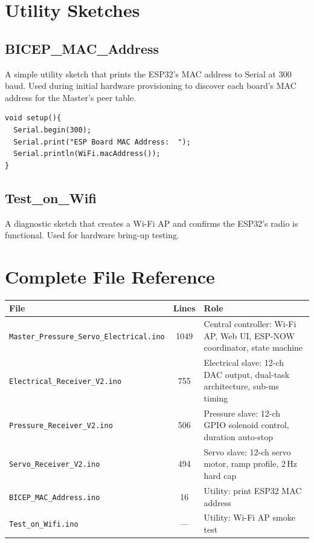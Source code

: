 \documentclass[11pt,a4paper]{article}
\begin{document}
\section{Utility Sketches}

\subsection{BICEP\_MAC\_Address}

A simple utility sketch that prints the ESP32's MAC address to Serial at
300\,baud. Used during initial hardware provisioning to discover each board's
MAC address for the Master's peer table.

\begin{lstlisting}[style=cppstyle]
void setup(){
  Serial.begin(300);
  Serial.print("ESP Board MAC Address:  ");
  Serial.println(WiFi.macAddress());
}
\end{lstlisting}

\subsection{Test\_on\_Wifi}

A diagnostic sketch that creates a Wi-Fi AP and confirms the ESP32's radio
is functional. Used for hardware bring-up testing.

\section{Complete File Reference}

\begin{center}
\begin{longtable}{p{6cm}cp{5.5cm}}
\toprule
\textbf{File} & \textbf{Lines} & \textbf{Role} \\
\midrule
\endhead
\texttt{Master\_Pressure\_Servo\_Electrical.ino} & 1049 & Central controller: Wi-Fi AP, Web UI, ESP-NOW coordinator, state machine \\
\texttt{Electrical\_Receiver\_V2.ino} & 755 & Electrical slave: 12-ch DAC output, dual-task architecture, sub-ms timing \\
\texttt{Pressure\_Receiver\_V2.ino} & 506 & Pressure slave: 12-ch GPIO solenoid control, duration auto-stop \\
\texttt{Servo\_Receiver\_V2.ino} & 494 & Servo slave: 12-ch servo motor, ramp profile, 2\,Hz hard cap \\
\texttt{BICEP\_MAC\_Address.ino} & 16 & Utility: print ESP32 MAC address \\
\texttt{Test\_on\_Wifi.ino} & --- & Utility: Wi-Fi AP smoke test \\
\bottomrule
\end{longtable}
\end{center}
\end{document}
